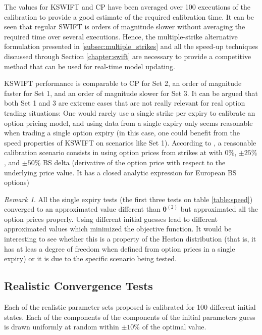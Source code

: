 \documentclass[12,twoside]{mammeTFM}
\theoremstyle{definition}
\theoremstyle{remark}
\newtheorem{remark}[thm]{Remark}
\begin{document}
The values for KSWIFT and CP have been averaged over 100 executions of the calibration to provide a good estimate of the required calibration time. It can be seen that regular SWIFT is orders of magnitude slower without averaging the required time over several executions. Hence, the multiple-strike alternative formulation presented in \ref{subsec:multiple_strikes} and all the speed-up techniques discussed through Section \ref{chapter:swift} are necessary to provide a competitive method that can be used for real-time model updating.

KSWIFT performance is comparable to CP for Set 2, an order of magnitude faster for Set 1, and an order of magnitude slower for Set 3. It can be argued that both Set 1 and 3 are extreme cases that are not really relevant for real option trading situations: One would rarely use a single strike per expiry to calibrate an option pricing model, and using data from a single expiry only seems reasonable when trading a single option expiry (in this case, one could benefit from the speed properties of KSWIFT on scenarios like Set 1). According to \cite{cui17}, a reasonable calibration scenario consists in using option prices from strikes at with $0\%$, $\pm 25\%$, and $\pm 50\%$ BS delta (derivative of the option price with respect to the underlying price value. It has a closed analytic expression for European BS options)

\begin{remark}
All the single expiry tests (the first three tests on table \ref{table:speed}) converged to an approximated value different than $\boldsymbol{\theta}^{(2)}$ but approximated all the option prices properly. Using different initial guesses lead to different approximated values which minimized the objective function. It would be interesting to see whether this is a property of the Heston distribution (that is, it has at leas a degree of freedom when defined from option prices in a single expiry) or it is due to the specific scenario being tested.
\end{remark}

\subsection{Realistic Convergence Tests}

Each of the realistic parameter sets proposed is calibrated for 100 different initial states. Each of the components of the components of the initial parameters guess is drawn uniformly at random within $\pm 10\%$ of the optimal value. 
\end{document}
